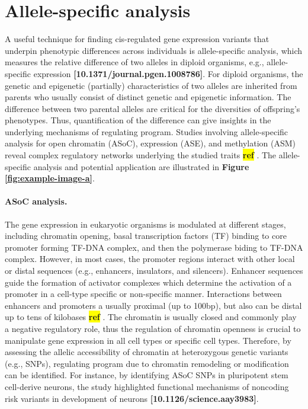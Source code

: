 \documentclass[12pt,usletter,fancy]{elegantbook}
\newcommand{\reqref}[1][ref]{
  \colorbox{yellow}{\textbf{#1}}
}
\begin{document}
\section*{Allele-specific analysis}
A useful technique for finding cis-regulated gene expression variants that underpin phenotypic differences across individuals is allele-specific analysis, which measures the relative difference of two alleles in diploid organisms, e.g., allele-specific expression \textbf{[10.1371/journal.pgen.1008786]}.
For diploid organisms, the genetic and epigenetic (partially) characteristics of two alleles are inherited from parents who usually consist of distinct genetic and epigenetic information.
The difference between two parental alleles are critical for the diversities of offspring's phenotypes.
Thus, quantification of the difference can give insights in the underlying mechanisms of regulating program.
Studies involving allele-specific analysis for open chromatin (ASoC), expression (ASE), and methylation (ASM) reveal complex regulatory networks underlying the studied traits\reqref.
The allele-specific analysis and potential application are illustrated in \textbf{Figure \ref{fig:example-image-a}}.

\paragraph*{ASoC analysis.} The gene expression in eukaryotic organisms is modulated at different stages, including chromatin opening, basal transcription factors (TF) binding to core promoter forming TF-DNA complex, and then the polymerase biding to TF-DNA complex.
However, in most cases, the promoter regions interact with other local or distal sequences (e.g., enhancers, insulators, and silencers).
Enhancer sequences guide the formation of activator complexes which determine the activation of a promoter in a cell-type specific or non-specific manner.
Interactions between enhancers and promoters a usually proximal (up to 100bp), but also can be distal up to tens of kilobases\reqref.
The chromatin is usually closed and commonly play a negative regulatory role, thus the regulation of chromatin openness is crucial to manipulate gene expression in all cell types or specific cell types.
Therefore, by assessing the allelic accessibility of chromatin at heterozygous genetic variants (e.g., SNPs), regulating program due to chromatin remodeling or modification can be identified.
For instance, by identifying ASoC SNPs in pluripotent stem cell-derive neurons, the study highlighted functional mechanisms of noncoding risk variants in development of neurons \textbf{[10.1126/science.aay3983]}.
\end{document}
